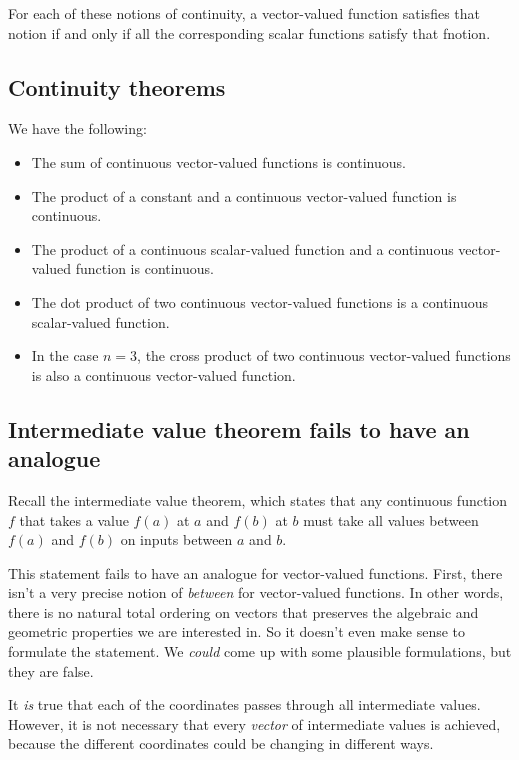 \documentclass[10pt]{amsart}
\begin{document}
For each of these notions of continuity, a vector-valued function
satisfies that notion if and only if all the corresponding scalar
functions satisfy that fnotion.

\subsection{Continuity theorems}

We have the following:

\begin{itemize}
\item The sum of continuous vector-valued functions is continuous.
\item The product of a constant and a continuous vector-valued
  function is continuous.
\item The product of a continuous scalar-valued function and a
  continuous vector-valued function is continuous.
\item The dot product of two continuous vector-valued functions is a
  continuous scalar-valued function.
\item In the case $n = 3$, the cross product of two continuous
  vector-valued functions is also a continuous vector-valued function.
\end{itemize}

\subsection{Intermediate value theorem fails to have an analogue}

Recall the intermediate value theorem, which states that any
continuous function $f$ that takes a value $f(a)$ at $a$ and $f(b)$ at
$b$ must take all values between $f(a)$ and $f(b)$ on inputs between
$a$ and $b$.

This statement fails to have an analogue for vector-valued
functions. First, there isn't a very precise notion of {\em between}
for vector-valued functions. In other words, there is no natural total
ordering on vectors that preserves the algebraic and geometric
properties we are interested in. So it doesn't even make sense to
formulate the statement. We {\em could} come up with some plausible
formulations, but they are false.

It {\em is} true that each of the coordinates passes through all
intermediate values. However, it is not necessary that every {\em
vector} of intermediate values is achieved, because the different
coordinates could be changing in different ways.
\end{document}

